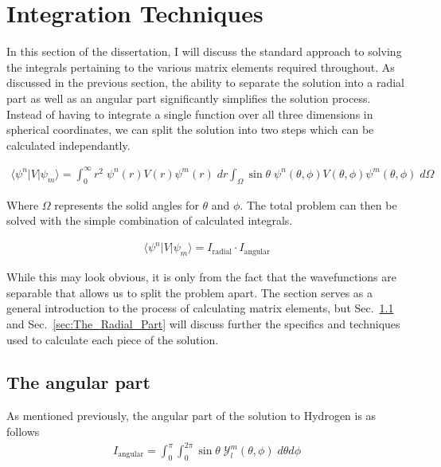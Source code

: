     \section{Integration Techniques} \label{sec:Integration_Techniques}
        In this section of the dissertation, I will discuss the standard approach to solving the integrals pertaining to the various matrix elements required throughout. As discussed in the previous section, the ability to separate the solution into a radial part as well as an angular part significantly simplifies the solution process. Instead of having to integrate a single function over all three dimensions in spherical coordinates, we can split the solution into two steps which can be calculated independantly.

        \begin{align}
            \langle \psi^n \vert V \vert \psi_m \rangle = \int_{0}^{\infty} r^2 \; \psi^n(r) V(r) \psi^m(r) \; dr \int_\Omega \sin \theta \; \psi^n(\theta, \phi) V(\theta, \phi) \psi^m(\theta, \phi) \; d\Omega
        \end{align}

        Where $\Omega$ represents the solid angles for $\theta$ and $\phi$. The total problem can then be solved with the simple combination of calculated integrals.

        \begin{align}
             \langle \psi^n \vert V \vert \psi_m \rangle = I_{\text{radial}} \cdot I_{\text{angular}}
        \end{align}

        While this may look obvious, it is only from the fact that the wavefunctions are separable that allows us to split the problem apart. The section serves as a general introduction to the process of calculating matrix elements, but Sec.~\ref{sec:The_Angular_Part} and Sec.~\ref{sec:The_Radial_Part} will discuss further the specifics and techniques used to calculate each piece of the solution.

        \subsection{The angular part} \label{sec:The_Angular_Part}
        As mentioned previously, the angular part of the solution to Hydrogen is as follows
        \begin{align}
            I_{\text{angular}} = \int_0^\pi \int_0^{2\pi}\sin \theta \;\mathcal{Y}^m_l (\theta, \phi) \; d\theta d\phi \label{eq:hydrogen_spherical_harmonic}
        \end{align}

